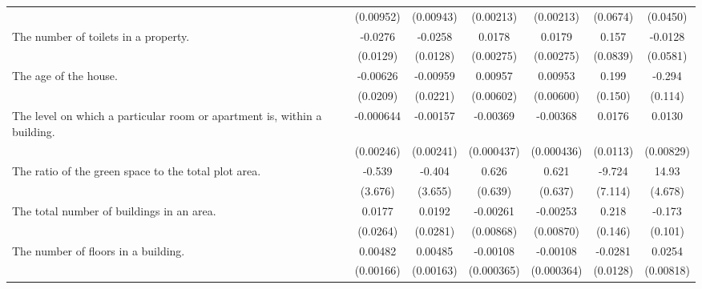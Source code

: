 {\begin{tabular}{l*{6}{c}}
                    &   (0.00952)         &   (0.00943)         &   (0.00213)         &   (0.00213)         &    (0.0674)         &    (0.0450)         \\
\addlinespace
The number of toilets in a property.&     -0.0276\sym{**} &     -0.0258\sym{**} &      0.0178\sym{***}&      0.0179\sym{***}&       0.157\sym{*}  &     -0.0128         \\
                    &    (0.0129)         &    (0.0128)         &   (0.00275)         &   (0.00275)         &    (0.0839)         &    (0.0581)         \\
\addlinespace
The age of the house.&    -0.00626         &    -0.00959         &     0.00957         &     0.00953         &       0.199         &      -0.294\sym{***}\\
                    &    (0.0209)         &    (0.0221)         &   (0.00602)         &   (0.00600)         &     (0.150)         &     (0.114)         \\
\addlinespace
The level on which a particular room or apartment is, within a building.&   -0.000644         &    -0.00157         &    -0.00369\sym{***}&    -0.00368\sym{***}&      0.0176         &      0.0130         \\
                    &   (0.00246)         &   (0.00241)         &  (0.000437)         &  (0.000436)         &    (0.0113)         &   (0.00829)         \\
\addlinespace
The ratio of the green space to the total plot area.&      -0.539         &      -0.404         &       0.626         &       0.621         &      -9.724         &       14.93\sym{***}\\
                    &     (3.676)         &     (3.655)         &     (0.639)         &     (0.637)         &     (7.114)         &     (4.678)         \\
\addlinespace
The total number of buildings in an area.&      0.0177         &      0.0192         &    -0.00261         &    -0.00253         &       0.218         &      -0.173\sym{*}  \\
                    &    (0.0264)         &    (0.0281)         &   (0.00868)         &   (0.00870)         &     (0.146)         &     (0.101)         \\
\addlinespace
The number of floors in a building.&     0.00482\sym{***}&     0.00485\sym{***}&    -0.00108\sym{***}&    -0.00108\sym{***}&     -0.0281\sym{**} &      0.0254\sym{***}\\
                    &   (0.00166)         &   (0.00163)         &  (0.000365)         &  (0.000364)         &    (0.0128)         &   (0.00818)         \\

\end{tabular}}
